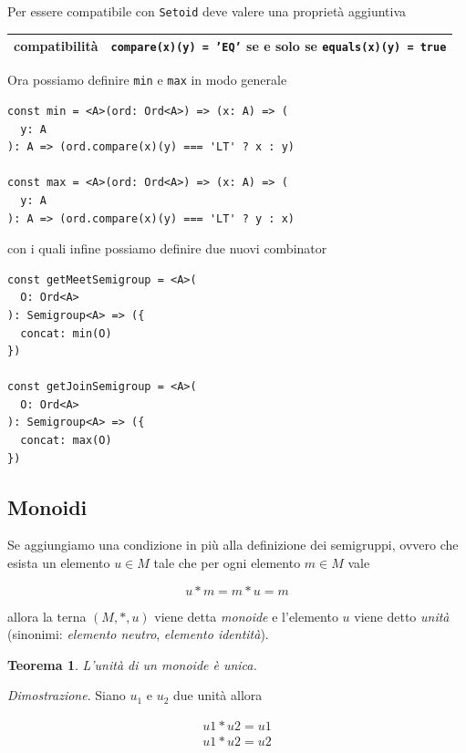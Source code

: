 \documentclass[12pt]{article}
\newtheorem{theorem}{Teorema}
\begin{document}
Per essere compatibile con \texttt{Setoid} deve valere una proprietà aggiuntiva

\begin{center}
\bgroup
\def\arraystretch{1.5}
\begin{tabular}{ |c|p{10cm}| }
\hline
compatibilità & \texttt{compare(x)(y) = 'EQ'} se e solo se \texttt{equals(x)(y) = true} \\
\hline
\end{tabular}
\egroup
\end{center}

Ora possiamo definire \texttt{min} e \texttt{max} in modo generale

\begin{verbatim}
const min = <A>(ord: Ord<A>) => (x: A) => (
  y: A
): A => (ord.compare(x)(y) === 'LT' ? x : y)

const max = <A>(ord: Ord<A>) => (x: A) => (
  y: A
): A => (ord.compare(x)(y) === 'LT' ? y : x)
\end{verbatim}

con i quali infine possiamo definire due nuovi combinator

\begin{verbatim}
const getMeetSemigroup = <A>(
  O: Ord<A>
): Semigroup<A> => ({
  concat: min(O)
})

const getJoinSemigroup = <A>(
  O: Ord<A>
): Semigroup<A> => ({
  concat: max(O)
})
\end{verbatim}

\subsection{Monoidi}

Se aggiungiamo una condizione in più alla definizione dei semigruppi, ovvero che esista un elemento $u \in M$
tale che per ogni elemento $m \in M$ vale

$$
u * m = m * u = m
$$

allora la terna $(M, *, u)$ viene detta \emph{monoide} e l'elemento $u$ viene detto \emph{unità}
(sinonimi: \emph{elemento neutro}, \emph{elemento identità}).

\begin{theorem}
L'unità di un monoide è unica.
\end{theorem}

\emph{Dimostrazione}. Siano $u_1$ e $u_2$ due unità allora

\begin{eqnarray}
u1 * u2 = u1 \\
u1 * u2 = u2
\end{eqnarray}
\end{document}
